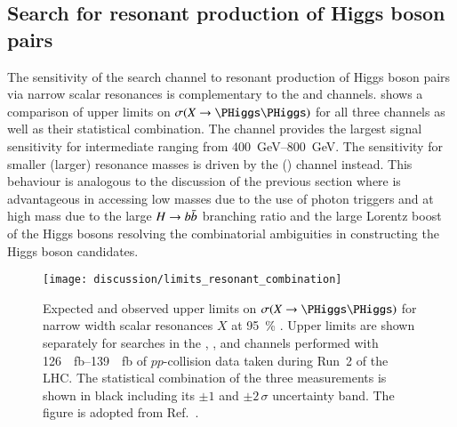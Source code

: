 \subsection{Search for resonant production of Higgs boson pairs}

The sensitivity of the \bbtautau search channel to resonant production
of Higgs boson pairs via narrow scalar resonances is complementary to
the \bbyy and \bbbb channels.  shows
a comparison of upper limits on $\sigma(X \to \HH)$ for all three
channels as well as their statistical combination. The \bbtautau
channel provides the largest signal sensitivity for intermediate \mX
ranging from \SIrange{400}{800}{\GeV}. The sensitivity for smaller
(larger) resonance masses is driven by the \bbyy (\bbbb) channel
instead. This behaviour is analogous to the discussion of the previous
section where \bbyy is advantageous in accessing low masses due to the
use of photon triggers and \bbbb at high mass due to the large
$H \to b\bar{b}$ branching ratio and the large Lorentz boost of the
Higgs bosons resolving the combinatorial ambiguities in constructing
the Higgs boson candidates.

\begin{figure}[htbp]
  \centering

  \texttt{[image: discussion/limits\_resonant\_combination]}

  \caption{Expected and observed upper limits on $\sigma(X \to \HH)$
    for narrow width scalar resonances $X$ at \SI{95}{\percent}
    \CLs. Upper limits are shown separately for searches in the \bbbb,
    \bbtautau, and \bbyy channels performed with
    \SIrange{126}{139}{\per\femto\barn} of $pp$-collision data taken
    during Run~2 of the LHC. The statistical combination of the three
    measurements is shown in black including its $\pm 1$ and
    $\pm 2\,\sigma$ uncertainty band. The figure is adopted from
    Ref.~\cite{ATLAS-CONF-2021-052}.}
  \label{fig:resonant_hh_comb_limits}
\end{figure}


